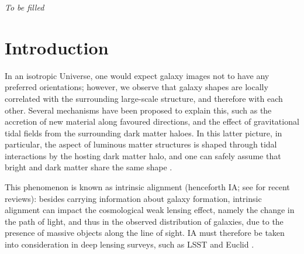 \documentclass[a4paper,11pt]{article}
\begin{document}

\begin{frontespizio}
\Sottotitolo{}
\end{frontespizio}

\begin{flushright}
\emph{To be filled \newline
}
\end{flushright}

\tableofcontents

\section{Introduction}
\label{sec:intro}
In an isotropic Universe, one would expect galaxy images not to have any preferred orientations; however, we observe that galaxy shapes are locally correlated with the surrounding large-scale structure, and therefore with each other. Several mechanisms have been proposed to explain this, such as the accretion of new material along favoured directions, and the effect of gravitational tidal fields from the surrounding dark matter haloes. In this latter picture, in particular, the aspect of luminous matter structures is shaped through tidal interactions by the hosting dark matter halo, and one can safely assume that bright and dark matter share the same shape \cite{Kiesslingetal2015}.

This phenomenon is known as intrinsic alignment (henceforth IA; see \cite{TroxelIshak2015, Joachimietal2015, Kiesslingetal2015, Kirketal2015} for recent reviews): besides carrying information about galaxy formation, intrinsic alignment can impact the cosmological weak lensing effect, namely the change in the path of light, and thus in the observed distribution of galaxies, due to the presence of massive objects along the line of sight. IA must therefore be taken into consideration in deep lensing surveys, such as LSST \cite{LSST2009} and Euclid \cite{Euclid2011}. 
\end{document}
